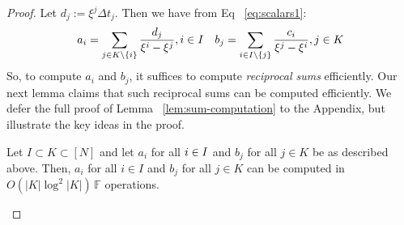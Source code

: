 \begin{proof}
    Let $d_j:=\xi^j \Delta t_j$. Then we have from Eq ~\eqref{eq:scalars1}:\\
    \begin{gather}\label{eq:scalars}
    a_i = \sum_{j\in K\setminus \{i\}}\frac{d_j}{\xi^i-\xi^j}, i\in \setind\quad
    b_j=  \sum_{i\in \setind\setminus \{j\}}\frac{c_i}{\xi^j - \xi^i}, j\in K
    \end{gather}
    So, to compute $a_i$ and $b_j$, it suffices to compute {\em reciprocal sums} efficiently. Our next lemma claims that
    such reciprocal sums can be computed efficiently.
    We defer the full proof of Lemma ~\ref{lem:sum-computation} to the Appendix, but illustrate the key ideas in the proof.
    \begin{lemma}\label{lem:sum-computation}
    Let $I\subset K\subset [N]$ and let $a_i$ for all $i \in I$ and $b_j$ for all $j \in K$ be as described above.
    Then, $a_i$ for all $i \in I$ and $b_j$ for all $j \in K$ can be computed in $O(|K|\log^2|K|)\, \mathbb{F}$ operations.
    \end{lemma}

\end{proof}
